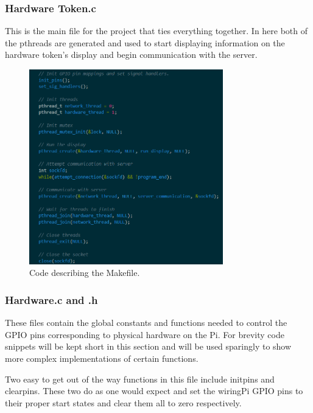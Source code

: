 \documentclass[a4paper,10pt]{article}
\begin{document}
\subsubsection{Hardware Token.c}
This is the main file for the project that ties everything together. In here both of the pthreads are generated and used to start displaying information on the hardware token's display and begin communication with the server. 

\begin{figure}[H]
  \centering
      \includegraphics[width=0.75\textwidth]{Assets/hardware_token.png}
  \caption{Code describing the Makefile.}
\end{figure}

\subsubsection{Hardware.c and .h}
These files contain the global constants and functions needed to control the GPIO pins corresponding to physical hardware on the Pi. For brevity code snippets will be kept short in this section and will be used sparingly to show more complex implementations of certain functions. 

Two easy to get out of the way functions in this file include init\textunderscore pins and clear\textunderscore pins. These two do as one would expect and set the wiringPi GPIO pins to their proper start states and clear them all to zero respectively.
\end{document}
